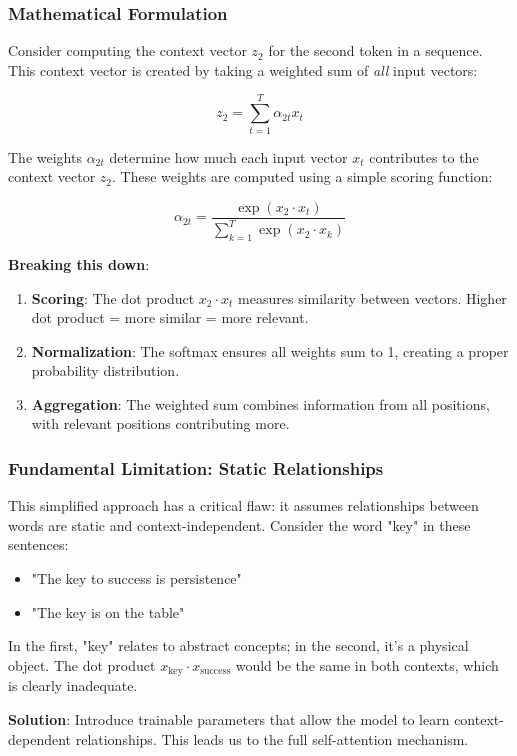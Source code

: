 \subsubsection{Mathematical Formulation}

Consider computing the context vector $z_2$ for the second token in a sequence. This context vector is created by taking a weighted sum of \textit{all} input vectors:

\[
  z_2 = \sum_{t=1}^{T} \alpha_{2t} x_t
\]

The weights $\alpha_{2t}$ determine how much each input vector $x_t$ contributes to the context vector $z_2$. These weights are computed using a simple scoring function:

\[
  \alpha_{2t} = \frac{\exp(x_2 \cdot x_t)}{\sum_{k=1}^{T} \exp(x_2 \cdot x_k)}
\]

\textbf{Breaking this down}:
\begin{enumerate}
  \item \textbf{Scoring}: The dot product $x_2 \cdot x_t$ measures similarity between vectors. Higher dot product = more similar = more relevant.
  \item \textbf{Normalization}: The softmax ensures all weights sum to 1, creating a proper probability distribution.
  \item \textbf{Aggregation}: The weighted sum combines information from all positions, with relevant positions contributing more.
\end{enumerate}

\subsubsection{Fundamental Limitation: Static Relationships}

This simplified approach has a critical flaw: it assumes relationships between words are static and context-independent. Consider the word "key" in these sentences:
\begin{itemize}
  \item "The key to success is persistence"
  \item "The key is on the table"
\end{itemize}

In the first, "key" relates to abstract concepts; in the second, it's a physical object. The dot product $x_{\text{key}} \cdot x_{\text{success}}$ would be the same in both contexts, which is clearly inadequate.

\textbf{Solution}: Introduce trainable parameters that allow the model to learn context-dependent relationships. This leads us to the full self-attention mechanism.

